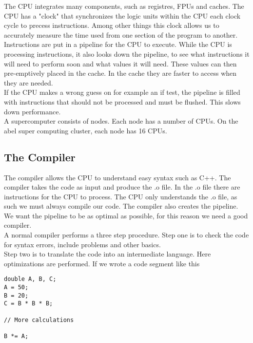 The CPU integrates many components, such as registres, FPUs and caches. The CPU has a "clock" that synchronizes the logic units within the CPU each clock cycle to precess instructions. Among other things this clock allows us to accurately measure the time used from one section of the program to another. \\

Instructions are put in a pipeline for the CPU to execute. While the CPU is processing instructions, it also looks down the pipeline, to see what instructions it will need to perform soon and what values it will need. These values can then pre-emptively placed in the cache. In the cache they are faster to access when they are needed. \\

If the CPU makes a wrong guess on for example an if test, the pipeline is filled with instructions that should not be processed and must be flushed. This slows down performance. \\

A supercomputer consists of nodes. Each node has a number of CPUs. On the abel super computing cluster, each node has 16 CPUs. 

\subsection{The Compiler}
The compiler allows the CPU to understand easy syntax such as C++. The compiler takes the code as input and produce the .o file. In the .o file there are instructions for the CPU to process. The CPU only understands the .o file, as such we must always compile our code. The compiler also creates the pipeline. We want the pipeline to be as optimal as possible, for this reason we need a good compiler. \\

A normal compiler performs a three step procedure. Step one is to check the code for syntax errors, include problems and other basics. \\

Step two is to translate the code into an intermediate language. Here optimizations are performed. If we wrote a code segment like this

\begin{lstlisting}
double A, B, C;
A = 50;
B = 20;
C = B * B * B;

// More calculations

B *= A;
\end{lstlisting}

